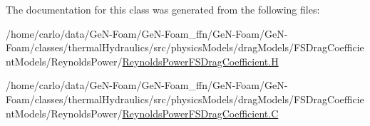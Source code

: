 The documentation for this class was generated from the following files\+:\begin{DoxyCompactItemize}
\item 
/home/carlo/data/\+Ge\+N-\/\+Foam/\+Ge\+N-\/\+Foam\+\_\+ffn/\+Ge\+N-\/\+Foam/\+Ge\+N-\/\+Foam/classes/thermal\+Hydraulics/src/physics\+Models/drag\+Models/\+F\+S\+Drag\+Coefficient\+Models/\+Reynolds\+Power/\hyperlink{ReynoldsPowerFSDragCoefficient_8H}{Reynolds\+Power\+F\+S\+Drag\+Coefficient.\+H}\item 
/home/carlo/data/\+Ge\+N-\/\+Foam/\+Ge\+N-\/\+Foam\+\_\+ffn/\+Ge\+N-\/\+Foam/\+Ge\+N-\/\+Foam/classes/thermal\+Hydraulics/src/physics\+Models/drag\+Models/\+F\+S\+Drag\+Coefficient\+Models/\+Reynolds\+Power/\hyperlink{ReynoldsPowerFSDragCoefficient_8C}{Reynolds\+Power\+F\+S\+Drag\+Coefficient.\+C}\end{DoxyCompactItemize}

